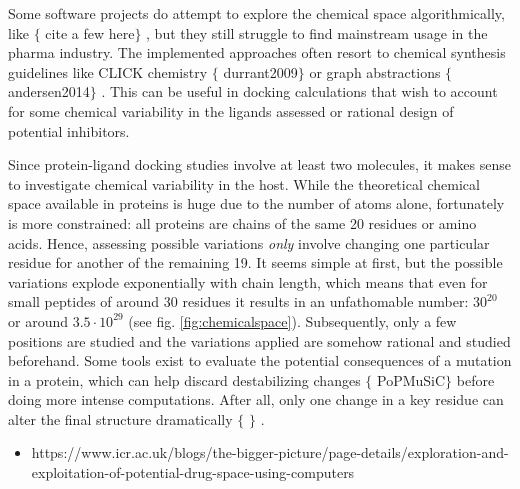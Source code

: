 Some software projects do attempt to explore the chemical space algorithmically, like $ \{ $ cite a few here$ \} $ , but they still struggle to find mainstream usage in the pharma industry. The implemented approaches often resort to chemical synthesis guidelines like CLICK chemistry $ \{ $ durrant2009$ \} $  or graph abstractions $ \{ $ andersen2014$ \} $ . This can be useful in docking calculations that wish to account for some chemical variability in the ligands assessed or rational design of potential inhibitors.

Since protein-ligand docking studies involve at least two molecules, it makes sense to investigate chemical variability in the host. While the theoretical chemical space available in proteins is huge due to the number of atoms alone, fortunately is more constrained: all proteins are chains of the same 20 residues or amino acids. Hence, assessing possible variations \textit{only} involve changing one particular residue for another of the remaining 19. It seems simple at first, but the possible variations explode exponentially with chain length, which means that even for small peptides of around 30 residues it results in an unfathomable number: $ 30^{20} $ or around $ 3.5·10^{29} $ (see fig. \ref{fig:chemicalspace}). Subsequently, only a few positions are studied and the variations applied are somehow rational and studied beforehand. Some tools exist to evaluate the potential consequences of a mutation in a protein, which can help discard destabilizing changes $ \{ $ PoPMuSiC$ \} $  before doing more intense computations. After all, only one change in a key residue can alter the final structure dramatically $ \{ $ $ \} $ .

\begin{itemize}
	\item https://www.icr.ac.uk/blogs/the-bigger-picture/page-details/exploration-and-exploitation-of-potential-drug-space-using-computers
\end{itemize}

